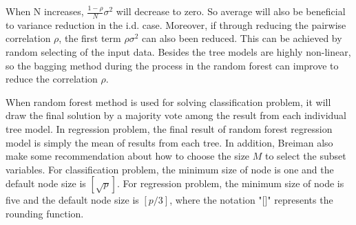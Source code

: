 When N increases, $\frac{1-\rho}{N}\sigma^2$ will decrease to zero. So average will also be beneficial to variance reduction in the i.d. case.  Moreover, if through reducing the pairwise correlation $\rho$, the first term $\rho\sigma^2$ can also been reduced. This can be achieved by random selecting of the input data. Besides the tree models are highly non-linear, so the bagging method during the process in the random forest  can improve to reduce the correlation $\rho$.  

When random forest method is used for solving classification problem, it will draw the final solution by a majority vote among the result from each individual tree model. In regression problem, the final result of random forest regression model is simply the mean of results from each tree. In addition, Breiman also make some recommendation about how to choose the size $M$ to select the subset variables. For classification problem, the minimum size of node is one and the default node size is $[\sqrt{p}]$. For regression problem, the minimum size of node is five and the default node size is $[p/3]$, where the notation "[]" represents the rounding function.
